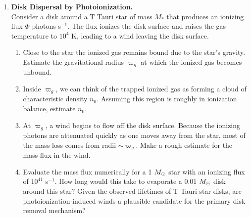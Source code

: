 \begin{enumerate}
\item {\bf Disk Dispersal by Photoionization.}\\
Consider a disk around a T Tauri star of mass $M_*$ that produces an ionizing flux $\Phi$ photons s$^{-1}$. The flux ionizes the disk surface and raises the gas temperature to $10^4$ K, leading to a wind leaving the disk surface.
\begin{enumerate}
\item Close to the star the ionized gas remains bound due to the star's gravity. Estimate the gravitational radius $\varpi_g$ at which the ionized gas becomes unbound.
\item Inside $\varpi_g$, we can think of the trapped ionized gas as forming a cloud of characteristic density $n_0$. Assuming this region is roughly in ionization balance, estimate $n_0$.
\item At $\varpi_g$, a wind begins to flow off the disk surface. Because the ionizing photons are attenuated quickly as one moves away from the star, most of the mass loss comes from radii $\sim \varpi_g$. Make a rough estimate for the mass flux in the wind.
\item Evaluate the mass flux numerically for a 1 $M_{\odot}$ star with an ionizing flux of $10^{41}$ s$^{-1}$. How long would this take to evaporate a $0.01$ $M_{\odot}$ disk around this star? Given the observed lifetimes of T Tauri star disks, are photoionization-induced winds a plausible candidate for the primary disk removal mechanism?
\end{enumerate}


\end{enumerate}
